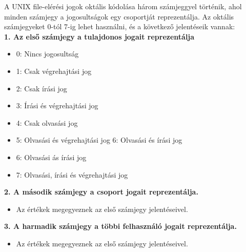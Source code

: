 \documentclass[11pt,a4paper]{article}
\begin{document}
            \begin{tcolorbox}[colback=blue!5!white,colframe=blue!50!black,title= 36. Ismertesse a UNIX file-elérési jogok oktális kódolását!]
                                        A UNIX file-elérési jogok oktális kódolása három számjeggyel történik, ahol minden számjegy a jogosultságok egy csoportját reprezentálja. Az oktális számjegyeket 0-tól 7-ig lehet használni, és a következő jelentéseik vannak:\\
                                        \textbf{1. Az első számjegy a tulajdonos jogait reprezentálja}    
                                        \begin{itemize}
                                            \item 0: Nincs jogosultság
                                            \item 1: Csak végrehajtási jog
                                            \item 2: Csak írási jog
                                            \item 3: Írási és végrehajtási jog
                                            \item 4: Csak olvasási jog
                                            \item 5: Olvasási és végrehajtási jog 6: Olvasási és írási jog
                                            \item 6: Olvasási ás írási jog
                                            \item 7: Olvasási, írási és végrehajtási jog
                                        \end{itemize}
                                        \textbf{2. A második számjegy a csoport jogait reprezentálja.}
                                        \begin{itemize}
                                            \item Az értékek megegyeznek az első számjegy jelentéseivel.
                                        \end{itemize}
                                        \textbf{3. A harmadik számjegy a többi felhasználó jogait reprezentálja.}
                                        \begin{itemize}
                                            \item Az értékek megegyeznek az első számjegy jelentéseivel.
                                        \end{itemize}

\end{tcolorbox}
\end{document}
